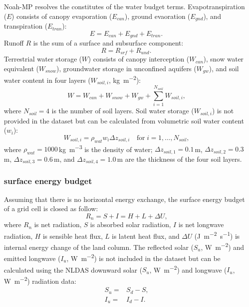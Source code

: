 \documentclass[essd]{copernicus}
\begin{document}
Noah-MP resolves the constitutes of the water budget terms. Evapotranspiration
($E$) consists of canopy evaporation ($E_{can}$), ground evaoration ($E_{gnd}$),
and transpiration ($E_{tran}$):
\begin{equation}
    E = E_{can} + E_{gnd} + E_{tran} \text{.}
\end{equation}
Runoff {$R$} is the sum of a surface and subsurface component:
\begin{equation}
    R = R_{srf} + R_{und} \text{.}
\end{equation}
Terrestrial water storage ($W$) consists of canopy interception ($W_{can}$),
snow water equivalent ($W_{snow}$), groundwater storage in unconfined aquifers
($W_{gw}$), and soil water content in four layers ($W_{soil,i}$,
\unit{kg~m^{-2}}):
\begin{equation}
    W = W_{can} + W_{snow} + W_{gw} + \sum_{i=1}^{N_{soil}} W_{soil,i} \text{,}
\end{equation}
where $N_{soil} = 4$ is the number of soil layers.
Soil water storage ($W_{soil,i}$) is not provided in the dataset but can be
calculated from volumetric soil water content ($w_{i}$):
\begin{equation}
    W_{soil,i} = \rho_{wat} w_i \Delta z_{soil,i}
    \quad \text{for} \; i = 1,\dots,N_{soil}
    \text{,} \label{eq:soil-vmc}
\end{equation}
where $\rho_{wat}=1000$\,\unit{kg~m^{-3}} is the density of water; $\Delta
z_{soil,1}=0.1$\,\unit{m}, $\Delta z_{soil,2}=0.3$\,\unit{m}, $\Delta
z_{soil,3}=0.6$\,\unit{m}, and $\Delta z_{soil,4}=1.0$\,\unit{m} are the thickness
of the four soil layers.

\subsubsection{surface energy budget}

Assuming that there is no horizontal energy exchange, the surface energy budget
of a grid cell is closed as follow:
\begin{equation}
    R_n = S + I = H + L + \Delta U \text{,} \label{eq:energy-balance}
\end{equation}
where $R_n$ is net radiation, $S$ is absorbed solar radiation, $I$ is net
longwave radiation, $H$ is sensible heat flux, $L$ is latent heat flux, and
$\Delta U$ (\unit{J~m^{-2}~s^{-1}}) is internal energy change of the land
column. The reflected solar ($S_u$, \unit{W~m^{-2}}) and emitted longwave
($I_u$, \unit{W~m^{-2}}) is not included in the dataset but can be calculated
using the NLDAS downward solar ($S_u$, \unit{W~m^{-2}}) and
longwave ($I_u$, \unit{W~m^{-2}}) radiation data:
\begin{align}
    S_u = & S_d - S \text{,} \\
    I_u = & I_d - I \text{.}
\end{align}
\end{document}
